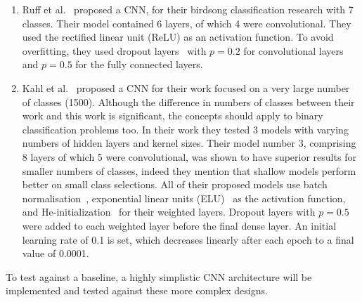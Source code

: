 \begin{enumerate}

  \item Ruff et al.~\cite{ruff2020automated} proposed a  CNN, for their birdsong
    classification research with 7 classes. Their model contained
    6 layers, of which 4 were convolutional. They used the rectified linear unit
    (ReLU) as an activation function. To avoid overfitting, they used dropout
    layers~\cite{srivastava2014dropout} with $p=0.2$ for
    convolutional layers and $p=0.5$ for the fully connected layers.

  \item Kahl et al.~\cite{kahl2017large} proposed a CNN for their work focused
    on a very large number of classes (1500). Although the difference in numbers
    of classes between their work and this work is significant, the concepts
    should apply to binary classification problems too. In their work they
    tested 3 models with varying numbers of hidden layers and kernel sizes.
    Their model number 3, comprising 8 layers of which 5 were convolutional,
    was shown to have superior results for smaller numbers of classes, indeed
    they mention that shallow models perform better on small class selections.
    All of their proposed models use batch normalisation~\cite{ioffe2015batch},
    exponential linear units (ELU)~\cite{clevert2015fast} as the activation
    function, and He-initialization~\cite{he2015delving} for their weighted
    layers. Dropout layers with $p=0.5$ were added to each weighted layer before
    the final dense layer. An initial learning rate of 0.1 is set, which
    decreases linearly after each epoch to a final value of 0.0001.


\end{enumerate}

To test against a baseline, a highly simplistic CNN architecture will
be implemented and tested against these more complex designs. 

